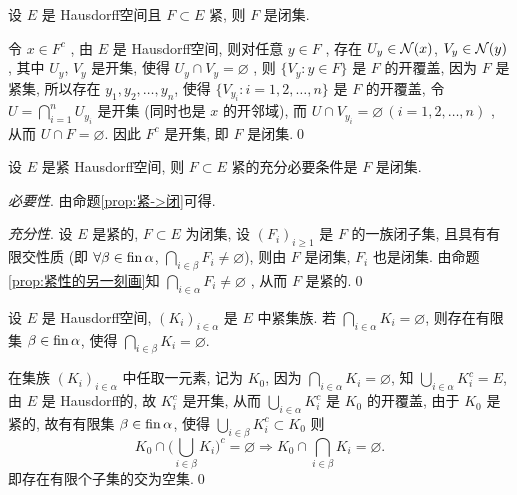      \begin{Proposition}\label{prop:紧->闭}
          设 $ E $ 是 Hausdorff空间且 $ F\subset E $ 紧, 则 $ F $ 是闭集. 
     \end{Proposition}

     \begin{Proof}
          令 $ x\in F^{c} $ , 由 $ E $ 是 Hausdorff空间, 则对任意 $  y\in F $ , 存在 $ U_{y}\in\mathcal{N}(x) $, $ V_{y}\in\mathcal{N}(y) $ , 其中 $ U_{y} $, $ V_{y} $ 是开集, 使得 $ U_{y}\cap V_{y}=\varnothing $ , 则 $\{ V_{y}:y\in F \}$ 是 $ F $ 的开覆盖, 因为 $ F $ 是紧集, 所以存在 $ y_{1}, y_{2}, \dots, y_{n} $, 使得 $ \{ V_{y_{i}}: i=1, 2, \dots, n \} $ 是 $ F $ 的开覆盖, 令 $ U=\bigcap_{i=1}^{n}U_{y_{i}} $ 是开集 (同时也是 $ x $ 的开邻域), 而 $ U\cap V_{y_{i}}=\varnothing\,(i=1, 2, \dots, n) $ , 从而 $ U\cap F=\varnothing $. 因此 $ F^{c} $ 是开集, 即 $ F $ 是闭集.\qed
     \end{Proof}

     \begin{Proposition}
          设 $ E $ 是紧 Hausdorff空间, 则 $ F\subset E $ 紧的充分必要条件是 $ F $ 是闭集. 
     \end{Proposition}
     
     \begin{Proof}
          \textsl{必要性}. 由命题\ref{prop:紧->闭}可得.

          \textsl{充分性}. 设 $ E $ 是紧的, $ F\subset E $ 为闭集, 设 $ (F_{i})_{i\geqslant1} $ 是 $ F $ 的一族闭子集, 且具有有限交性质 (即 $ \forall \beta\in\operatorname{fin}\alpha $, $ \bigcap_{i\in\beta}F_{i}\neq\varnothing $), 则由 $ F $ 是闭集,  $ F_{i} $ 也是闭集. 由命题\ref{prop:紧性的另一刻画}知 $ \bigcap_{i\in\alpha}F_{i}\neq\varnothing $ , 从而 $ F $ 是紧的.\qed
     \end{Proof}

     \begin{Proposition}
          设 $ E $ 是 Hausdorff空间,  $ (K_{i})_{i\in\alpha} $ 是 $ E $ 中紧集族. 若 $ \bigcap_{i\in\alpha}K_{i}=\varnothing $, 则存在有限集 $ \beta\in\operatorname{fin}\alpha $, 使得 $ \bigcap_{i\in\beta}K_{i}=\varnothing $.   
     \end{Proposition}
     
     \begin{Proof}
          在集族 $ (K_{i})_{i\in\alpha} $ 中任取一元素, 记为 $ K_{0} $, 因为 $ \bigcap_{i\in\alpha}K_{i}=\varnothing $, 
          知 $ \bigcup_{i\in\alpha}K_{i}^{c}=E $, 由 $ E $ 是 Hausdorff的, 故 $ K_{i}^{c} $ 是开集, 从而 $ \bigcup_{i\in\alpha}K_{i}^{c} $ 是 $ K_{0} $ 的开覆盖, 由于 $ K_{0} $ 是紧的, 故有有限集 $ \beta\in\operatorname{fin}\alpha $, 使得 $ \bigcup_{i\in\beta}K_{i}^{c}\subset K_{0} $ 则
          \[
               K_{0}\cap \bigg( \bigcup_{i\in\beta}K_{i} \bigg)^{c}=\varnothing \Rightarrow K_{0}\cap\bigcap_{i\in\beta}K_{i}=\varnothing.
          \]
          即存在有限个子集的交为空集.\qed
     \end{Proof}

